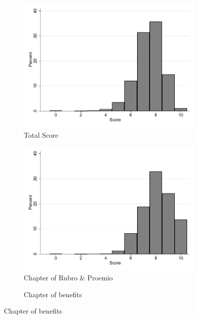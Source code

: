 \documentclass[oneside,11pt]{article}
\begin{document}
\begin{figure}[H] 
    \label{}
    \caption{Distribution of ratings}
     \begin{center}
      \begin{subfigure}{0.49\textwidth}
        \caption{Total Score}
        \centering
        \includegraphics[width=\textwidth]{Figuras/hist_total.pdf}
    \end{subfigure}
    \begin{subfigure}{0.49\textwidth}
        \caption{Chapter of Rubro \& Proemio}
        \centering
        \includegraphics[width=\textwidth]{Figuras/hist_calif_rubro_proemio.pdf}
    \end{subfigure}
    \begin{subfigure}{0.49\textwidth}
        \caption{Chapter of benefits}

\end{subfigure}
\end{center}
\end{figure}
\end{document}
